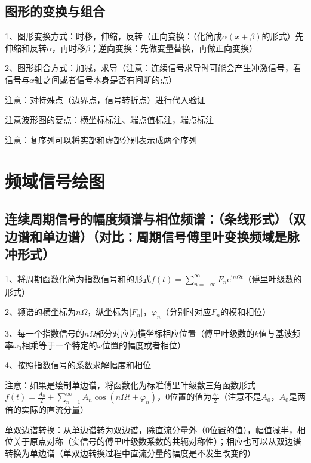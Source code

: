 \subsection{图形的变换与组合}

1、图形变换方式：时移，伸缩，反转（正向变换：（化简成$\alpha(x + \beta)$的形式）先伸缩和反转$\alpha$，再时移$\beta$；逆向变换：先做变量替换，再做正向变换）

2、图形组合方式：加减，求导（注意：连续信号求导时可能会产生冲激信号，看信号与$x$轴之间或者信号本身是否有间断的点）

注意：对特殊点（边界点，信号转折点）进行代入验证



注意波形图的要点：横坐标标注、端点值标注，端点标注

注意：复序列可以将实部和虚部分别表示成两个序列

\section{频域信号绘图}



\subsection{连续周期信号的幅度频谱与相位频谱：（条线形式）（双边谱和单边谱）（对比：周期信号傅里叶变换频域是脉冲形式）}

1、将周期函数化简为指数信号和的形式$f(t)=\sum_{n=-\infty}^{\infty} F_{n} \mathrm{e}^{\mathrm{j} n \Omega t}$（傅里叶级数的形式）

2、频谱的横坐标为$n \Omega$，纵坐标为$|F_n|$，$\varphi_{n}$（分别时对应$F_n$的模和相位）

3、每一个指数信号的$n \Omega$部分对应为横坐标相应位置（傅里叶级数的$k$值与基波频率$\omega_0$相乘等于一个特定的$\omega$位置的幅度或者相位）

4、按照指数信号的系数求解幅度和相位

注意：如果是绘制单边谱，将函数化为标准傅里叶级数三角函数形式$f(t)=\frac{A_{0}}{2}+\sum_{n=1}^{\infty} A_{n} \cos \left(n \Omega t+\varphi_{n}\right)$，0位置的值为$\frac{A_{0}}{2}$（注意不是$A_{0}$，$A_{0}$是两倍的实际的直流分量）

单双边谱转换：从单边谱转为双边谱，除直流分量外（0位置的值），幅值减半，相位关于原点对称（实信号的傅里叶级数系数的共轭对称性）；相应也可以从双边谱转换为单边谱（单双边转换过程中直流分量的幅度是不发生改变的）



